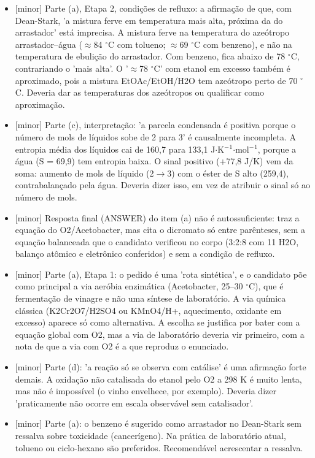 \documentclass{article}%
\begin{document}
\begin{itemize}%
\item%
{[}minor{]} Parte (a), Etapa 2, condições de refluxo: a afirmação de que, com Dean{-}Stark, 'a mistura ferve em temperatura mais alta, próxima da do arrastador' está imprecisa. A mistura ferve na temperatura do azeótropo arrastador--água ($\approx$84 $^\circ$C com tolueno; $\approx$69 $^\circ$C com benzeno), e não na temperatura de ebulição do arrastador. Com benzeno, fica abaixo de 78 $^\circ$C, contrariando o 'mais alta'. O '$\approx$78 $^\circ$C' com etanol em excesso também é aproximado, pois a mistura EtOAc/EtOH/H2O tem azeótropo perto de 70 $^\circ$C. Deveria dar as temperaturas dos azeótropos ou qualificar como aproximação.%
\item%
{[}minor{]} Parte (c), interpretação: 'a parcela condensada é positiva porque o número de mols de líquidos sobe de 2 para 3' é causalmente incompleta. A entropia média dos líquidos cai de 160,7 para 133,1 J$\cdot$K$^{-}$$^{1}$$\cdot$mol$^{-}$$^{1}$, porque a água (S = 69,9) tem entropia baixa. O sinal positivo (+77,8 J/K) vem da soma: aumento de mols de líquido (2$\to$3) com o éster de S alto (259,4), contrabalançado pela água. Deveria dizer isso, em vez de atribuir o sinal só ao número de mols.%
\item%
{[}minor{]} Resposta final (ANSWER) do item (a) não é autossuficiente: traz a equação do O2/Acetobacter, mas cita o dicromato só entre parênteses, sem a equação balanceada que o candidato verificou no corpo (3:2:8 com 11 H2O, balanço atômico e eletrônico conferidos) e sem a condição de refluxo.%
\item%
{[}minor{]} Parte (a), Etapa 1: o pedido é uma 'rota sintética', e o candidato põe como principal a via aeróbia enzimática (Acetobacter, 25--30 $^\circ$C), que é fermentação de vinagre e não uma síntese de laboratório. A via química clássica (K2Cr2O7/H2SO4 ou KMnO4/H+, aquecimento, oxidante em excesso) aparece só como alternativa. A escolha se justifica por bater com a equação global com O2, mas a via de laboratório deveria vir primeiro, com a nota de que a via com O2 é a que reproduz o enunciado.%
\item%
{[}minor{]} Parte (d): 'a reação só se observa com catálise' é uma afirmação forte demais. A oxidação não catalisada do etanol pelo O2 a 298 K é muito lenta, mas não é impossível (o vinho envelhece, por exemplo). Deveria dizer 'praticamente não ocorre em escala observável sem catalisador'.%
\item%
{[}minor{]} Parte (a): o benzeno é sugerido como arrastador no Dean{-}Stark sem ressalva sobre toxicidade (cancerígeno). Na prática de laboratório atual, tolueno ou ciclo{-}hexano são preferidos. Recomendável acrescentar a ressalva.%
\end{itemize}%
\end{document}
